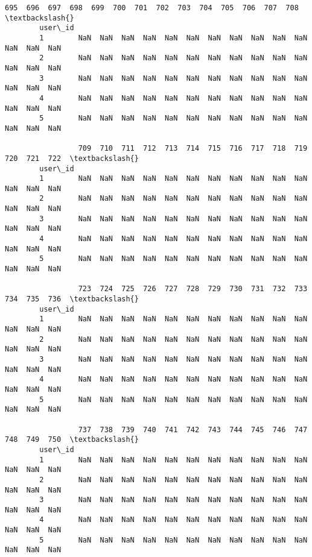 \documentclass[11pt]{article}
\begin{document}
\begin{Verbatim}[commandchars=\\\{\}]
                 695  696  697  698  699  700  701  702  703  704  705  706  707  708  \textbackslash{}
        user\_id                                                                         
        1        NaN  NaN  NaN  NaN  NaN  NaN  NaN  NaN  NaN  NaN  NaN  NaN  NaN  NaN   
        2        NaN  NaN  NaN  NaN  NaN  NaN  NaN  NaN  NaN  NaN  NaN  NaN  NaN  NaN   
        3        NaN  NaN  NaN  NaN  NaN  NaN  NaN  NaN  NaN  NaN  NaN  NaN  NaN  NaN   
        4        NaN  NaN  NaN  NaN  NaN  NaN  NaN  NaN  NaN  NaN  NaN  NaN  NaN  NaN   
        5        NaN  NaN  NaN  NaN  NaN  NaN  NaN  NaN  NaN  NaN  NaN  NaN  NaN  NaN   
        
                 709  710  711  712  713  714  715  716  717  718  719  720  721  722  \textbackslash{}
        user\_id                                                                         
        1        NaN  NaN  NaN  NaN  NaN  NaN  NaN  NaN  NaN  NaN  NaN  NaN  NaN  NaN   
        2        NaN  NaN  NaN  NaN  NaN  NaN  NaN  NaN  NaN  NaN  NaN  NaN  NaN  NaN   
        3        NaN  NaN  NaN  NaN  NaN  NaN  NaN  NaN  NaN  NaN  NaN  NaN  NaN  NaN   
        4        NaN  NaN  NaN  NaN  NaN  NaN  NaN  NaN  NaN  NaN  NaN  NaN  NaN  NaN   
        5        NaN  NaN  NaN  NaN  NaN  NaN  NaN  NaN  NaN  NaN  NaN  NaN  NaN  NaN   
        
                 723  724  725  726  727  728  729  730  731  732  733  734  735  736  \textbackslash{}
        user\_id                                                                         
        1        NaN  NaN  NaN  NaN  NaN  NaN  NaN  NaN  NaN  NaN  NaN  NaN  NaN  NaN   
        2        NaN  NaN  NaN  NaN  NaN  NaN  NaN  NaN  NaN  NaN  NaN  NaN  NaN  NaN   
        3        NaN  NaN  NaN  NaN  NaN  NaN  NaN  NaN  NaN  NaN  NaN  NaN  NaN  NaN   
        4        NaN  NaN  NaN  NaN  NaN  NaN  NaN  NaN  NaN  NaN  NaN  NaN  NaN  NaN   
        5        NaN  NaN  NaN  NaN  NaN  NaN  NaN  NaN  NaN  NaN  NaN  NaN  NaN  NaN   
        
                 737  738  739  740  741  742  743  744  745  746  747  748  749  750  \textbackslash{}
        user\_id                                                                         
        1        NaN  NaN  NaN  NaN  NaN  NaN  NaN  NaN  NaN  NaN  NaN  NaN  NaN  NaN   
        2        NaN  NaN  NaN  NaN  NaN  NaN  NaN  NaN  NaN  NaN  NaN  NaN  NaN  NaN   
        3        NaN  NaN  NaN  NaN  NaN  NaN  NaN  NaN  NaN  NaN  NaN  NaN  NaN  NaN   
        4        NaN  NaN  NaN  NaN  NaN  NaN  NaN  NaN  NaN  NaN  NaN  NaN  NaN  NaN   
        5        NaN  NaN  NaN  NaN  NaN  NaN  NaN  NaN  NaN  NaN  NaN  NaN  NaN  NaN   
        

\end{Verbatim}
\end{document}
